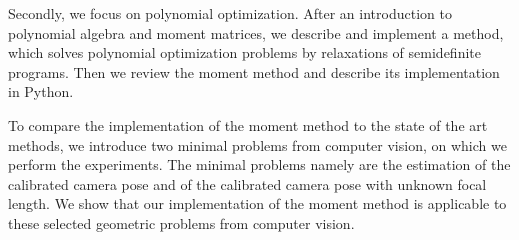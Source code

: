 Secondly, we focus on polynomial optimization.
After an introduction to polynomial algebra and moment matrices, we describe and implement a method, which solves polynomial optimization problems by relaxations of semidefinite programs.
Then we review the moment method and describe its implementation in Python.

To compare the implementation of the moment method to the state of the art methods, we introduce two minimal problems from computer vision, on which we perform the experiments.
The minimal problems namely are the estimation of the calibrated camera pose and of the calibrated camera pose with unknown focal length.
We show that our implementation of the moment method is applicable to these selected geometric problems from computer vision.
